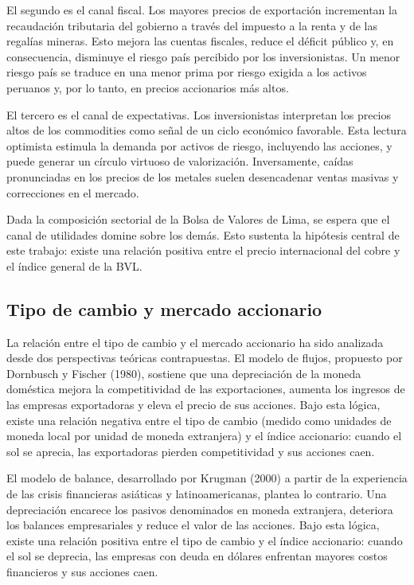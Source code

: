 \documentclass[12pt, a4paper]{article}
\begin{document}
El segundo es el canal fiscal. Los mayores precios de exportación incrementan la recaudación tributaria del gobierno a través del impuesto a la renta y de las regalías mineras. Esto mejora las cuentas fiscales, reduce el déficit público y, en consecuencia, disminuye el riesgo país percibido por los inversionistas. Un menor riesgo país se traduce en una menor prima por riesgo exigida a los activos peruanos y, por lo tanto, en precios accionarios más altos.

El tercero es el canal de expectativas. Los inversionistas interpretan los precios altos de los commodities como señal de un ciclo económico favorable. Esta lectura optimista estimula la demanda por activos de riesgo, incluyendo las acciones, y puede generar un círculo virtuoso de valorización. Inversamente, caídas pronunciadas en los precios de los metales suelen desencadenar ventas masivas y correcciones en el mercado.

Dada la composición sectorial de la Bolsa de Valores de Lima, se espera que el canal de utilidades domine sobre los demás. Esto sustenta la hipótesis central de este trabajo: existe una relación positiva entre el precio internacional del cobre y el índice general de la BVL.

\subsection{Tipo de cambio y mercado accionario}

La relación entre el tipo de cambio y el mercado accionario ha sido analizada desde dos perspectivas teóricas contrapuestas. El modelo de flujos, propuesto por Dornbusch y Fischer (1980), sostiene que una depreciación de la moneda doméstica mejora la competitividad de las exportaciones, aumenta los ingresos de las empresas exportadoras y eleva el precio de sus acciones. Bajo esta lógica, existe una relación negativa entre el tipo de cambio (medido como unidades de moneda local por unidad de moneda extranjera) y el índice accionario: cuando el sol se aprecia, las exportadoras pierden competitividad y sus acciones caen.

El modelo de balance, desarrollado por Krugman (2000) a partir de la experiencia de las crisis financieras asiáticas y latinoamericanas, plantea lo contrario. Una depreciación encarece los pasivos denominados en moneda extranjera, deteriora los balances empresariales y reduce el valor de las acciones. Bajo esta lógica, existe una relación positiva entre el tipo de cambio y el índice accionario: cuando el sol se deprecia, las empresas con deuda en dólares enfrentan mayores costos financieros y sus acciones caen.
\end{document}

